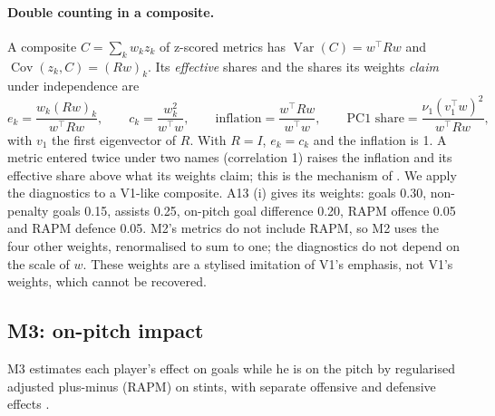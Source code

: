 \documentclass[11pt,a4paper]{article}
\DeclareMathOperator{\Var}{Var}
\DeclareMathOperator{\Cov}{Cov}
\begin{document}
\paragraph{Double counting in a composite.}
A composite $C = \sum_k w_k z_k$ of z-scored metrics has $\Var(C) = w^\top R w$
and $\Cov(z_k, C) = (Rw)_k$. Its \emph{effective} shares and the shares its
weights \emph{claim} under independence are
\begin{equation}
  e_k = \frac{w_k (Rw)_k}{w^\top R w}, \qquad c_k = \frac{w_k^2}{w^\top w},
  \qquad \text{inflation} = \frac{w^\top R w}{w^\top w},
  \qquad \text{PC1 share} = \frac{\nu_1 (v_1^\top w)^2}{w^\top R w},
  \label{eq:composite}
\end{equation}
with $v_1$ the first eigenvector of $R$. With $R = I$, $e_k = c_k$ and the
inflation is 1. A metric entered twice under two names (correlation 1) raises
the inflation and its effective share above what its weights claim; this is
the mechanism of \citet{paruolo2013voodoo}. We apply the diagnostics to a
V1-like composite. A13 (i) gives its weights: goals 0.30, non-penalty goals
0.15, assists 0.25, on-pitch goal difference 0.20, RAPM offence 0.05 and RAPM
defence 0.05. M2's metrics do not include RAPM, so M2 uses the four other
weights, renormalised to sum to one; the diagnostics do not depend on the scale
of $w$. These weights are a stylised imitation of V1's emphasis, not V1's
weights, which cannot be recovered.

\subsection{M3: on-pitch impact}
\label{sec:m3}

M3 estimates each player's effect on goals while he is on the pitch by
regularised adjusted plus-minus (RAPM) on stints, with separate offensive and
defensive effects \citep{hvattum2020offdef,sill2010rapm,macdonald2012ridge}.
\end{document}
